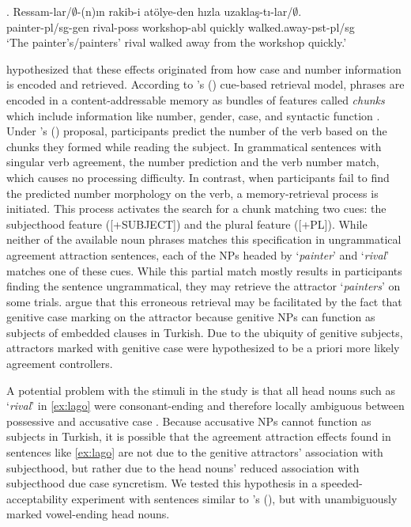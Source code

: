 \documentclass[times,linguex]{glossa}\usepackage[]{graphicx}\usepackage[]{color}
\begin{document}
\ex. \label{ex:lago}
\gll Ressam-lar/$\emptyset$-(n)ın rakib-i atölye-den hızla uzaklaş-tı-lar/$\emptyset$.\\
painter-pl/sg-gen rival-poss workshop-abl quickly walked.away-pst-pl/sg\\
\glt `The painter's/painters' rival walked away from the workshop quickly.'


\citet{LagoEtAl:2018} hypothesized that these effects originated from how case and number information is encoded and retrieved. According to \citeauthor{LewisVasishth:2005}'s (\citeyear{LewisVasishth:2005}) cue-based retrieval model, phrases are encoded in a content-addressable memory as bundles of features called \textit{chunks} which include information like number, gender, case, and syntactic function \citep{SmithVasishth:2020}. Under \citeauthor{LagoEtAl:2018}'s (\citeyear{LagoEtAl:2018}) proposal, participants predict the number of the verb based on the chunks they formed while reading the subject. In grammatical sentences with singular verb agreement, the number prediction and the verb number match, which causes no processing difficulty. In contrast, when participants fail to find the predicted number morphology on the verb, a memory-retrieval process is initiated. This process activates the search for a chunk matching two cues: the subjecthood feature ([+SUBJECT]) and the plural feature ([+PL]). While neither of the available noun phrases matches this specification in ungrammatical agreement attraction sentences, each of the NPs headed by `\textit{painter}' and `\textit{rival}' matches one of these cues. While this partial match mostly results in participants finding the sentence ungrammatical, they may retrieve the attractor `\textit{painters}' on some trials. \citet{LagoEtAl:2018} argue that this erroneous retrieval may be facilitated by the fact that genitive case marking on the attractor because genitive NPs can function as subjects of embedded clauses in Turkish. Due to the ubiquity of genitive subjects, attractors marked with genitive case were hypothesized to be a priori more likely agreement controllers.

A potential problem with the stimuli in the \citet{LagoEtAl:2018} study is that all head nouns such as `\textit{rival}' in \ref{ex:lago} were consonant-ending and therefore locally ambiguous between possessive and accusative case \citet{GokselKerslake:2005}. Because accusative NPs cannot function as subjects in Turkish, it is possible that the agreement attraction effects found in sentences like \ref{ex:lago} are not due to the genitive attractors' association with subjecthood, but rather due to the head nouns' reduced association with subjecthood due case syncretism. We tested this hypothesis in a speeded-acceptability experiment with sentences similar to \citeauthor{LagoEtAl:2018}'s (\citeyear{LagoEtAl:2018}), but with unambiguously marked vowel-ending head nouns.
\end{document}
